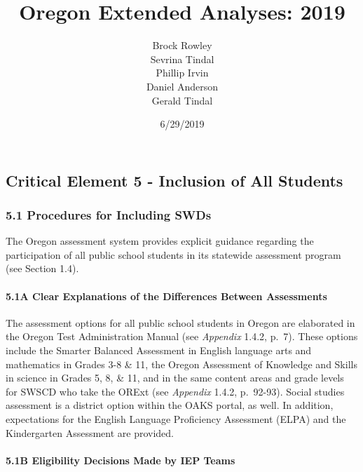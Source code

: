 \documentclass[]{article}
\title{Oregon Extended Analyses: 2019}
\author{Brock Rowley \\ Sevrina Tindal \\ Phillip Irvin \\ Daniel Anderson \\ Gerald Tindal}
\date{6/29/2019}
\let\oldparagraph\paragraph
\renewcommand{\paragraph}[1]{\oldparagraph{#1}\mbox{}}
\begin{document}
\maketitle

{
\setcounter{tocdepth}{5}
\tableofcontents
}
\hypertarget{critical-element-5---inclusion-of-all-students}{%
\subsection{Critical Element 5 - Inclusion of All
Students}\label{critical-element-5---inclusion-of-all-students}}

\hypertarget{procedures-for-including-swds}{%
\subsubsection{5.1 Procedures for Including
SWDs}\label{procedures-for-including-swds}}

The Oregon assessment system provides explicit guidance regarding the
participation of all public school students in its statewide assessment
program (see Section 1.4).

\hypertarget{a-clear-explanations-of-the-differences-between-assessments}{%
\paragraph{5.1A Clear Explanations of the Differences Between
Assessments}\label{a-clear-explanations-of-the-differences-between-assessments}}

The assessment options for all public school students in Oregon are
elaborated in the Oregon Test Administration Manual (see \emph{Appendix}
1.4.2, p.~7). These options include the Smarter Balanced Assessment in
English language arts and mathematics in Grades 3-8 \& 11, the Oregon
Assessment of Knowledge and Skills in science in Grades 5, 8, \& 11, and
in the same content areas and grade levels for SWSCD who take the ORExt
(see \emph{Appendix} 1.4.2, p.~92-93). Social studies assessment is a
district option within the OAKS portal, as well. In addition,
expectations for the English Language Proficiency Assessment (ELPA) and
the Kindergarten Assessment are provided.

\hypertarget{b-eligibility-decisions-made-by-iep-teams}{%
\paragraph{5.1B Eligibility Decisions Made by IEP
Teams}\label{b-eligibility-decisions-made-by-iep-teams}}
\end{document}
